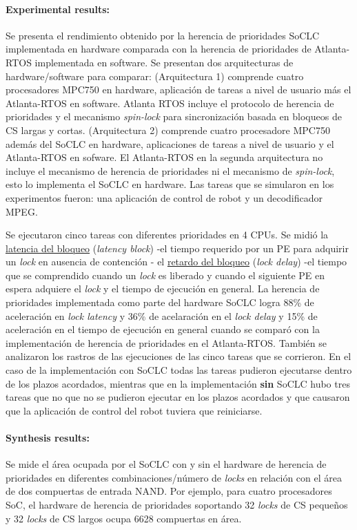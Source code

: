 \paragraph{\textnormal{\textbf{Experimental results:}}}
Se presenta el rendimiento obtenido por la herencia de prioridades SoCLC implementada en hardware comparada con la herencia de prioridades de Atlanta-RTOS implementada en software. Se presentan dos arquitecturas de hardware/software para comparar: (Arquitectura 1) comprende cuatro procesadores MPC750 en hardware, aplicación de tareas a nivel de usuario más el Atlanta-RTOS en software. Atlanta RTOS incluye el protocolo de herencia de prioridades y el mecanismo \textit{spin-lock} para sincronización basada en bloqueos de CS largas y cortas. (Arquitectura 2) comprende cuatro procesadore MPC750 además del SoCLC en hardware, aplicaciones de tareas a nivel de usuario y el Atlanta-RTOS en sofware. El Atlanta-RTOS en la segunda arquitectura no incluye el mecanismo de herencia de prioridades ni el mecanismo de \textit{spin-lock}, esto lo implementa el SoCLC en hardware. Las tareas que se simularon en los experimentos fueron: una aplicación de control de robot y un decodificador MPEG. 

Se ejecutaron cinco tareas con diferentes prioridades en 4 CPUs. Se midió la \underline{latencia del bloqueo} (\textit{latency block}) -el tiempo requerido por un PE para adquirir un \textit{lock} en ausencia de contención - el \underline{retardo del bloqueo} (\textit{lock delay}) -el tiempo que se comprendido cuando un \textit{lock} es liberado y cuando el siguiente PE en espera adquiere el \textit{lock} y el tiempo de ejecución en general. La herencia de prioridades implementada como parte del hardware SoCLC logra 88\% de aceleración en \textit{lock latency} y 36\% de acelaración en el \textit{lock delay} y 15\% de aceleración en el tiempo de ejecución en general cuando se comparó con la implementación de herencia de prioridades en el Atlanta-RTOS. También se analizaron los rastros de las ejecuciones de las cinco tareas que se corrieron. En el caso de la implementación con SoCLC todas las tareas pudieron ejecutarse dentro de los plazos acordados, mientras que en la implementación \textbf{sin} SoCLC hubo tres tareas que no que no se pudieron ejecutar en los plazos acordados y que causaron que la aplicación de control del robot tuviera que reiniciarse.

\paragraph{\textnormal{\textbf{Synthesis results:}}}
Se mide el área ocupada por el SoCLC con y sin el hardware de herencia de prioridades en diferentes combinaciones/número de \textit{locks} en relación con el área de dos compuertas de entrada NAND. Por ejemplo, para cuatro procesadores SoC, el hardware de herencia de prioridades soportando 32 \textit{locks} de CS pequeños y 32 \textit{locks} de CS largos ocupa 6628 compuertas en área.

